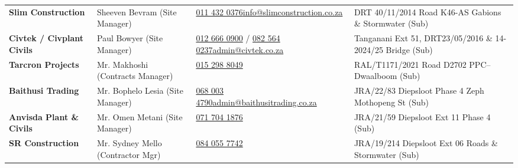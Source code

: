 \documentclass[a4paper,11pt]{article}
\begin{document}
\begin{tabularx}{\textwidth}{@{}
    >{\raggedright\arraybackslash}p{3.4cm}
    >{\raggedright\arraybackslash}p{3.2cm}
    >{\raggedright\arraybackslash}p{4.0cm}
    >{\raggedright\arraybackslash}X
@{}}
\rowcolor{mhbluelight}
\fontsize{7.5pt}{9.3pt}\selectfont\bfseries Slim Construction & \fontsize{7.5pt}{9.3pt}\selectfont Sheeven Bevram (Site Manager) & \fontsize{7.5pt}{9.3pt}\selectfont \href{tel:0114320376}{011 432 0376}\newline\href{mailto:info@slimconstruction.co.za}{info@slimconstruction.co.za} & \fontsize{7.5pt}{9.3pt}\selectfont DRT 40/11/2014 Road K46-AS Gabions \& Stormwater (Sub) \\
\fontsize{7.5pt}{9.3pt}\selectfont\bfseries Civtek / Civplant Civils & \fontsize{7.5pt}{9.3pt}\selectfont Paul Bowyer (Site Manager) & \fontsize{7.5pt}{9.3pt}\selectfont \href{tel:0126660900}{012 666 0900} / \href{tel:0825640237}{082 564 0237}\newline\href{mailto:admin@civtek.co.za}{admin@civtek.co.za} & \fontsize{7.5pt}{9.3pt}\selectfont Tanganani Ext 51, DRT23/05/2016 \& 14-2024/25 Bridge (Sub) \\
\rowcolor{mhbluelight}
\fontsize{7.5pt}{9.3pt}\selectfont\bfseries Tarcron Projects & \fontsize{7.5pt}{9.3pt}\selectfont Mr. Makhoshi (Contracts Manager) & \fontsize{7.5pt}{9.3pt}\selectfont \href{tel:0152988049}{015 298 8049} & \fontsize{7.5pt}{9.3pt}\selectfont RAL/T1171/2021 Road D2702 PPC--Dwaalboom (Sub) \\
\fontsize{7.5pt}{9.3pt}\selectfont\bfseries Baithusi Trading & \fontsize{7.5pt}{9.3pt}\selectfont Mr. Bophelo Lesia (Site Manager) & \fontsize{7.5pt}{9.3pt}\selectfont \href{tel:0680034790}{068 003 4790}\newline\href{mailto:admin@baithusitrading.co.za}{admin@baithusitrading.co.za} & \fontsize{7.5pt}{9.3pt}\selectfont JRA/22/83 Diepsloot Phase 4 Zeph Mothopeng St (Sub) \\
\rowcolor{mhbluelight}
\fontsize{7.5pt}{9.3pt}\selectfont\bfseries Anvisda Plant \& Civils & \fontsize{7.5pt}{9.3pt}\selectfont Mr. Omen Metani (Site Manager) & \fontsize{7.5pt}{9.3pt}\selectfont \href{tel:0717041876}{071 704 1876} & \fontsize{7.5pt}{9.3pt}\selectfont JRA/21/59 Diepsloot Ext 11 Phase 4 (Sub) \\
\fontsize{7.5pt}{9.3pt}\selectfont\bfseries SR Construction & \fontsize{7.5pt}{9.3pt}\selectfont Mr. Sydney Mello (Contractor Mgr) & \fontsize{7.5pt}{9.3pt}\selectfont \href{tel:0840557742}{084 055 7742} & \fontsize{7.5pt}{9.3pt}\selectfont JRA/19/214 Diepsloot Ext 06 Roads \& Stormwater (Sub) \\
\end{tabularx}
\renewcommand{\arraystretch}{1}

\clearpage
\end{document}

